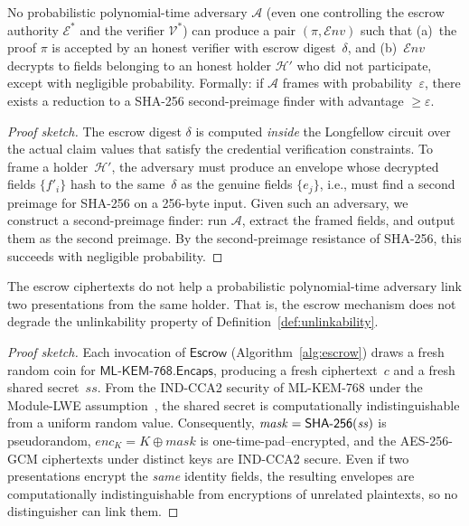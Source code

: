 \begin{theorem}\label{thm:non-frameability}
  No probabilistic polynomial-time adversary $\mathcal{A}$ (even one
  controlling the escrow authority $\mathcal{E}^*$ and the verifier
  $\mathcal{V}^*$) can produce a pair $(\pi, \mathcal{E}\mathit{nv})$
  such that (a)~the proof $\pi$ is accepted by an honest verifier with
  escrow digest~$\delta$, and (b)~$\mathcal{E}\mathit{nv}$ decrypts
  to fields belonging to an honest holder $\mathcal{H}'$ who did not
  participate, except with negligible probability.  Formally: if
  $\mathcal{A}$ frames with probability~$\varepsilon$, there exists a
  reduction to a SHA-256 second-preimage finder with advantage
  $\geq \varepsilon$.
\end{theorem}

\begin{proof}[Proof sketch]
  The escrow digest $\delta$ is computed \emph{inside} the Longfellow
  circuit over the actual claim values that satisfy the credential
  verification constraints.  To frame a holder~$\mathcal{H}'$, the
  adversary must produce an envelope whose decrypted fields
  $\{f'_i\}$ hash to the same~$\delta$ as the genuine fields
  $\{e_j\}$, i.e., must find a second preimage for SHA-256 on a
  256-byte input.  Given such an adversary, we construct a
  second-preimage finder: run $\mathcal{A}$, extract the framed
  fields, and output them as the second preimage.  By the
  second-preimage resistance of SHA-256, this succeeds with
  negligible probability.
\end{proof}

\begin{theorem}\label{thm:unlinkability}
  The escrow ciphertexts do not help a probabilistic polynomial-time
  adversary link two presentations from the same holder.  That is,
  the escrow mechanism does not degrade the unlinkability property
  of Definition~\ref{def:unlinkability}.
\end{theorem}

\begin{proof}[Proof sketch]
  Each invocation of $\mathsf{Escrow}$ (Algorithm~\ref{alg:escrow})
  draws a fresh random coin for $\textsf{ML-KEM-768}.\mathsf{Encaps}$,
  producing a fresh ciphertext~$c$ and a fresh shared secret~$\mathit{ss}$.
  From the IND-CCA2 security of ML-KEM-768 under the Module-LWE
  assumption~\cite{fips203}, the shared secret is computationally
  indistinguishable from a uniform random value.  Consequently,
  $\mathit{mask} = \mathsf{SHA\textnormal{-}256}(\mathit{ss})$ is
  pseudorandom, $\mathit{enc}_K = K \oplus \mathit{mask}$ is
  one-time-pad--encrypted, and the AES-256-GCM ciphertexts under
  distinct keys are IND-CCA2 secure.  Even if two presentations
  encrypt the \emph{same} identity fields, the resulting envelopes
  are computationally indistinguishable from encryptions of unrelated
  plaintexts, so no distinguisher can link them.
\end{proof}

